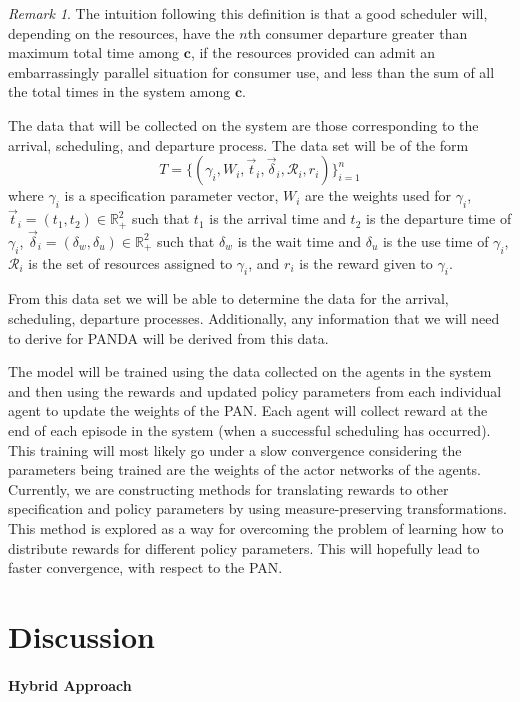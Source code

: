 \documentclass{article}
\theoremstyle{definition}
\theoremstyle{remark}
\newtheorem*{remark}{Remark}
\begin{document}
		\begin{remark}
			The intuition following this definition is that a good scheduler will, depending on the resources, have the $n$th consumer departure greater than maximum total time among $\mathbf{c}$, if the resources provided can admit an embarrassingly parallel situation for consumer use, and less than the sum of all the total times in the system among $\mathbf{c}$.
		\end{remark}
	
		The data that will be collected on the system are those corresponding to the arrival, scheduling, and departure process. The data set will be of the form
		\[
		T = \{(\gamma_{i}, W_{i},\vec{t}_{i}, \vec{\delta}_{i}, \mathcal{R}_{i}, r_{i})\}_{i = 1}^{n} 
		\]
		where $\gamma_{i}$ is a specification parameter vector, $W_{i}$ are the weights used for $\gamma_{i}$, $\vec{t}_{i} = (t_{1}, t_{2}) \in \mathbb{R}_{+}^{2}$ such that $t_{1}$ is the arrival time and $t_{2}$ is the departure time of $\gamma_{i}$, $\vec{\delta}_{i} = (\delta_{w}, \delta_{u}) \in \mathbb{R}_{+}^{2}$ such that $\delta_{w}$ is the wait time and $\delta_{u}$ is the use time of $\gamma_{i}$, $\mathcal{R}_{i}$ is the set of resources assigned to $\gamma_{i}$, and $r_{i}$ is the reward given to $\gamma_{i}$. 
		
		From this data set we will be able to determine the data for the arrival, scheduling, departure processes. Additionally, any information that we will need to derive for PANDA will be derived from this data. 
		
		The model will be trained using the data collected on the agents in the system and then using the rewards and updated policy parameters from each individual agent to update the weights of the PAN. Each agent will collect reward at the end of each episode in the system (when a successful scheduling has occurred). This training will most likely go under a slow convergence considering the parameters being trained are the weights of the actor networks of the agents. Currently, we are constructing methods for translating rewards to other specification and policy parameters by using measure-preserving transformations. This method is explored as a way for overcoming the problem of learning how to distribute rewards for different policy parameters. This will hopefully lead to faster convergence, with respect to the PAN.

	\section{Discussion}

		\paragraph{Hybrid Approach}

	\newpage
	
	\cite{carastan2017obtaining}

	\printbibliography
\end{document}
